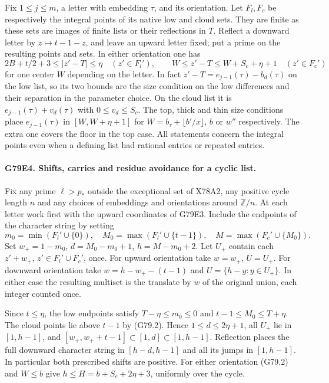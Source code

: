 Fix $1\le j\le m$, a letter with embedding $\tau$, and its orientation.
Let $F_l,F_c$ be respectively the integral points of its native low
and cloud sets. They are finite as these sets are images of finite
lists or their reflections in $T$. Reflect a downward letter by
$z\mapsto t-1-z$, and leave an upward letter fixed; put a prime on
the resulting points and sets. In either orientation one has
\[
 2B+t/2+3\le |z'-T|\le\eta\quad(z'\in F_l'),\qquad
 W\le z'-T\le W+S_c+\eta+1\quad(z'\in F_c')
                                                               \tag{G79.2}
\]
for one center $W$ depending on the letter. In fact
$z'-T=e_{j-1}(\tau)-b_d(\tau)$ on the low list, so its two
bounds are the size condition on the low differences and their
separation in the parameter choice. On the cloud list it is
$e_{j-1}(\tau)+v_d(\tau)$ with $0\le v_d\le S_c$.
The top, thick and thin size conditions place $e_{j-1}(\tau)$ in
$[W,W+\eta+1]$ for $W=b_\tau+\lfloor b'/x\rfloor$, $b$ or
$w''$ respectively. The extra one covers the floor in the top case.
All statements concern the integral points even when a defining
list had rational entries or repeated entries.

\paragraph{G79E4. Shifts, carries and residue avoidance for a cyclic list.}
Fix any prime $\ell>p_*$ outside the exceptional set of X78A2, any
positive cycle length $n$ and any choices of embeddings and
orientations around $\mathbb Z/n$. At each letter work first with
the upward coordinates of G79E3. Include the endpoints of the
character string by setting
\[
 m_0=\min(F_l'\cup\{0\}),\quad M_0=\max(F_l'\cup\{t-1\}),\quad
 M=\max(F_c'\cup\{M_0\}).
\]
Set $w_+=1-m_0$, $d=M_0-m_0+1$, $h=M-m_0+2$.
Let $U_+$ contain each $z'+w_+$, $z'\in F_l'\cup F_c'$, once.
For upward orientation take $w=w_+$, $U=U_+$. For downward
orientation take $w=h-w_+-(t-1)$ and
$U=\{h-y:y\in U_+\}$. In either case the resulting multiset is
the translate by $w$ of the original union, each integer counted once.

Since $t\le\eta$, the low endpoints satisfy $T-\eta\le m_0\le 0$
and $t-1\le M_0\le T+\eta$. The cloud points lie above $t-1$
by (G79.2). Hence $1\le d\le2\eta+1$, all $U_+$ lie in $[1,h-1]$,
and $[w_+,w_++t-1]\subset[1,d]\subset[1,h-1]$. Reflection places
the full downward character string in $[h-d,h-1]$ and all its jumps
in $[1,h-1]$. In particular both prescribed shifts are positive.
For either orientation (G79.2) and $W\le b$ give
$h\le H=b+S_c+2\eta+3$, uniformly over the cycle.

